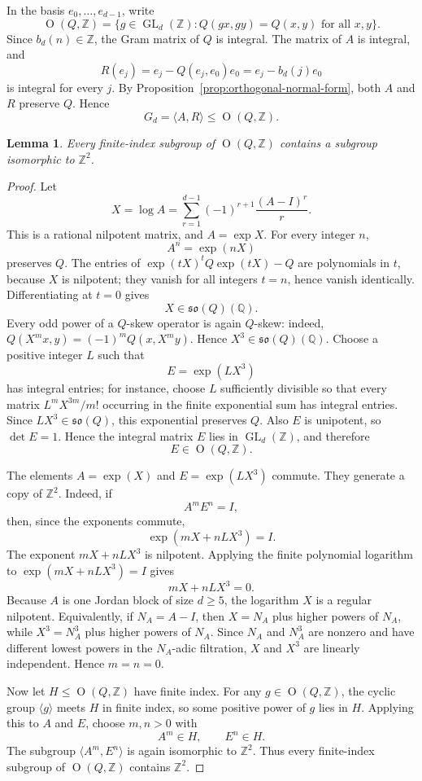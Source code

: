 \documentclass[a4paper,11pt]{amsart}
\newtheorem{lemma}[theorem]{Lemma}
\theoremstyle{remark}
\newcommand{\Z}{\mathbb Z}
\newcommand{\Q}{\mathbb Q}
\DeclareMathOperator{\GL}{GL}
\DeclareMathOperator{\Ogrp}{O}
\numberwithin{equation}{section}
\begin{document}
In the basis \(e_0,\ldots,e_{d-1}\), write
\[
        \Ogrp(Q,\Z)=\{g\in\GL_d(\Z):Q(gx,gy)=Q(x,y)\text{ for all }x,y\}.
\]
Since \(b_d(n)\in\Z\), the Gram matrix of \(Q\) is integral.  The matrix of \(A\) is integral, and
\[
        R(e_j)=e_j-Q(e_j,e_0)e_0=e_j-b_d(j)e_0
\]
is integral for every \(j\).  By Proposition~\ref{prop:orthogonal-normal-form}, both \(A\) and \(R\) preserve \(Q\).  Hence
\[
        G_d=\langle A,R\rangle\leq\Ogrp(Q,\Z).
\]

\begin{lemma}\label{lem:ambient-Z2}
Every finite-index subgroup of \(\Ogrp(Q,\Z)\) contains a subgroup isomorphic to \(\Z^2\).
\end{lemma}

\begin{proof}
Let
\[
        X=\log A
        =
        \sum_{r=1}^{d-1}(-1)^{r+1}\frac{(A-I)^r}{r}.
\]
This is a rational nilpotent matrix, and \(A=\exp X\).  For every integer \(n\),
\[
        A^n=\exp(nX)
\]
preserves \(Q\).  The entries of \(\exp(tX)^tQ\exp(tX)-Q\) are polynomials in \(t\), because \(X\) is nilpotent; they vanish for all integers \(t=n\), hence vanish identically.  Differentiating at \(t=0\) gives
\[
        X\in\mathfrak{so}(Q)(\Q).
\]
Every odd power of a \(Q\)-skew operator is again \(Q\)-skew: indeed, \(Q(X^m x,y)=(-1)^m Q(x,X^m y)\).  Hence \(X^3\in\mathfrak{so}(Q)(\Q)\).  Choose a positive integer \(L\) such that
\[
        E=\exp(LX^3)
\]
has integral entries; for instance, choose \(L\) sufficiently divisible so that every matrix \(L^mX^{3m}/m!\) occurring in the finite exponential sum has integral entries.  Since \(LX^3\in\mathfrak{so}(Q)\), this exponential preserves \(Q\).  Also \(E\) is unipotent, so \(\det E=1\).  Hence the integral matrix \(E\) lies in \(\GL_d(\Z)\), and therefore
\[
        E\in\Ogrp(Q,\Z).
\]

The elements \(A=\exp(X)\) and \(E=\exp(LX^3)\) commute.  They generate a copy of \(\Z^2\).  Indeed, if
\[
        A^mE^n=I,
\]
then, since the exponents commute,
\[
        \exp(mX+nLX^3)=I.
\]
The exponent \(mX+nLX^3\) is nilpotent.  Applying the finite polynomial logarithm to \(\exp(mX+nLX^3)=I\) gives
\[
        mX+nLX^3=0.
\]
Because \(A\) is one Jordan block of size \(d\ge5\), the logarithm \(X\) is a regular nilpotent.  Equivalently, if \(N_A=A-I\), then \(X=N_A\) plus higher powers of \(N_A\), while \(X^3=N_A^3\) plus higher powers of \(N_A\).  Since \(N_A\) and \(N_A^3\) are nonzero and have different lowest powers in the \(N_A\)-adic filtration, \(X\) and \(X^3\) are linearly independent.  Hence \(m=n=0\).

Now let \(H\le\Ogrp(Q,\Z)\) have finite index.  For any \(g\in\Ogrp(Q,\Z)\), the cyclic group \(\langle g\rangle\) meets \(H\) in finite index, so some positive power of \(g\) lies in \(H\).  Applying this to \(A\) and \(E\), choose \(m,n>0\) with
\[
        A^m\in H,
        \qquad
        E^n\in H.
\]
The subgroup \(\langle A^m,E^n\rangle\) is again isomorphic to \(\Z^2\).  Thus every finite-index subgroup of \(\Ogrp(Q,\Z)\) contains \(\Z^2\).
\end{proof}
\end{document}
